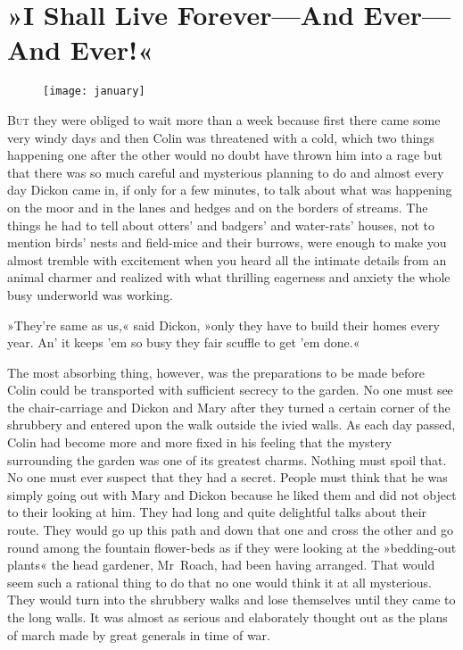 \chapter{»I Shall Live Forever—And Ever—And Ever!«}
	
\begin{figure}[t!]
\centering
\texttt{[image: january]}
\end{figure}

	\lettrine[lines=6]{B}{ut} they were obliged to wait more than a week because first there came some very windy days and then Colin was threatened with a cold, which two things happening one after the other would no doubt have thrown him into a rage but that there was so much careful and mysterious planning to do and almost every day Dickon came in, if only for a few minutes, to talk about what was happening on the moor and in the lanes and hedges and on the borders of streams. The things he had to tell about otters' and badgers' and water-rats' houses, not to mention birds' nests and field-mice and their burrows, were enough to make you almost tremble with excitement when you heard all the intimate details from an animal charmer and realized with what thrilling eagerness and anxiety the whole busy underworld was working.

»They're same as us,« said Dickon, »only they have to build their homes every year. An' it keeps 'em so busy they fair scuffle to get 'em done.«

The most absorbing thing, however, was the preparations to be made before Colin could be transported with sufficient secrecy to the garden. No one must see the chair-carriage and Dickon and Mary after they turned a certain corner of the shrubbery and entered upon the walk outside the ivied walls. As each day passed, Colin had become more and more fixed in his feeling that the mystery surrounding the garden was one of its greatest charms. Nothing must spoil that. No one must ever suspect that they had a secret. People must think that he was simply going out with Mary and Dickon because he liked them and did not object to their looking at him. They had long and quite delightful talks about their route. They would go up this path and down that one and cross the other and go round among the fountain flower-beds as if they were looking at the »bedding-out plants« the head gardener, Mr~Roach, had been having arranged. That would seem such a rational thing to do that no one would think it at all mysterious. They would turn into the shrubbery walks and lose themselves until they came to the long walls. It was almost as serious and elaborately thought out as the plans of march made by great generals in time of war.


